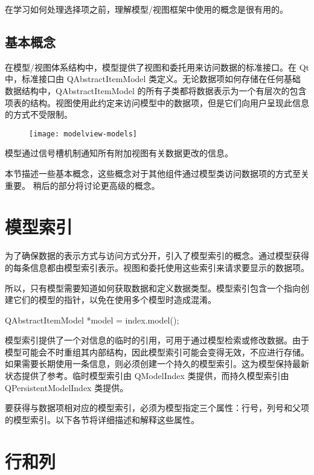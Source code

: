 在学习如何处理选择项之前，理解模型/视图框架中使用的概念是很有用的。

\subsection{基本概念}

在模型/视图体系结构中，模型提供了视图和委托用来访问数据的标准接口。在 Qt 中，标准接口由 QAbstractItemModel 类定义。无论数据项如何存储在任何基础数据结构中，QAbstractItemModel 的所有子类都将数据表示为一个有层次的包含项表的结构。视图使用此约定来访问模型中的数据项，但是它们向用户呈现此信息的方式不受限制。

\begin{figure}[hpt!]  
	\centering
    \texttt{[image: modelview-models]}
\end{figure}

模型通过信号槽机制通知所有附加视图有关数据更改的信息。

本节描述一些基本概念，这些概念对于其他组件通过模型类访问数据项的方式至关重要。 稍后的部分将讨论更高级的概念。

\section{模型索引}

为了确保数据的表示方式与访问方式分开，引入了模型索引的概念。通过模型获得的每条信息都由模型索引表示。视图和委托使用这些索引来请求要显示的数据项。

所以，只有模型需要知道如何获取数据和定义数据类型。模型索引包含一个指向创建它们的模型的指针，以免在使用多个模型时造成混淆。

\begin{cppcode}
QAbstractItemModel *model = index.model();
\end{cppcode}

模型索引提供了一个对信息的临时的引用，可用于通过模型检索或修改数据。由于模型可能会不时重组其内部结构，因此模型索引可能会变得无效，不应进行存储。如果需要长期使用一条信息，则必须创建一个持久的模型索引。这为模型保持最新状态提供了参考。临时模型索引由 QModelIndex 类提供，而持久模型索引由 QPersistentModelIndex 类提供。

要获得与数据项相对应的模型索引，必须为模型指定三个属性：行号，列号和父项的模型索引。以下各节将详细描述和解释这些属性。

\section{行和列}

